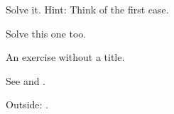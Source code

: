\begin{exercise}[A title]\flmLabels{\label{ref1}}
Solve it. Hint: Think of the first case.
\end{exercise}

\begin{exercise}\flmLabels{\label{ref2}}
Solve this one too.
\end{exercise}

\begin{exercise}
An exercise without a title.
\end{exercise}

See  and .

Outside: .%

